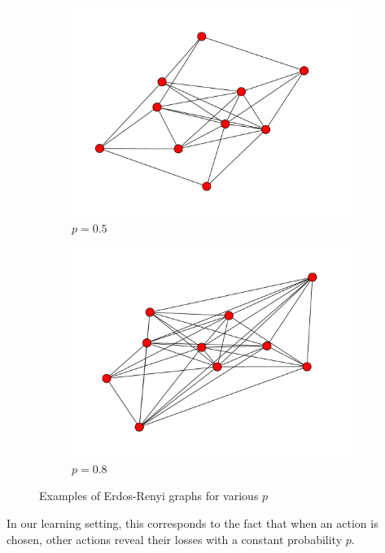 \documentclass[10pt,a4paper]{scrartcl}
\begin{document}
\begin{figure}[H]
\begin{center}
\begin{subfigure}[b]{0.45\textwidth}
                \includegraphics[width=\textwidth]{figures/ER_graph_5.pdf}
                \caption{$p=0.5$}
        \end{subfigure}
	 \begin{subfigure}[b]{0.45\textwidth}
                \includegraphics[width=\textwidth]{figures/ER_graph_8.pdf}
                \caption{$p=0.8$}
        \end{subfigure}
\end{center}
\caption{Examples of Erdos-Renyi graphs for various $p$}
 \label{er_ex}
\end{figure}
In our learning setting, this corresponds to the fact that when an action is chosen, other actions reveal their losses with a constant probability $p$.
\end{document}
